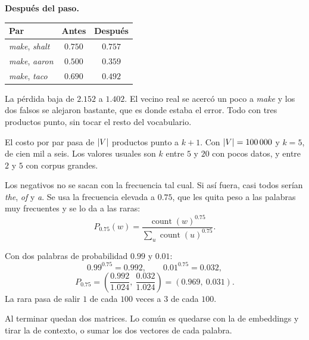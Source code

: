 \documentclass[11pt,letterpaper]{article}
\begin{document}
\begin{ejemplo}
    \textbf{Después del paso.}
    \begin{center}
    \begin{tabular}{lcc}
        \toprule
        \textbf{Par} & \textbf{Antes} & \textbf{Después} \\
        \midrule
        \textit{make}, \textit{shalt} & $0.750$ & $0.757$ \\
        \textit{make}, \textit{aaron} & $0.500$ & $0.359$ \\
        \textit{make}, \textit{taco}  & $0.690$ & $0.492$ \\
        \bottomrule
    \end{tabular}
    \end{center}
    La pérdida baja de $2.152$ a $1.402$. El vecino real se acercó un
    poco a \textit{make} y los dos falsos se alejaron bastante, que es
    donde estaba el error. Todo con tres productos punto, sin tocar el
    resto del vocabulario.
\end{ejemplo}

\begin{idea}
    El costo por par pasa de $\left\lvert V \right\rvert$ productos punto a $k + 1$. Con
    $\left\lvert V \right\rvert = 100\,000$ y $k = 5$, de cien mil a seis. Los valores
    usuales son $k$ entre $5$ y $20$ con pocos datos, y entre $2$ y
    $5$ con corpus grandes.
\end{idea}

Los negativos no se sacan con la frecuencia tal cual. Si así fuera,
casi todos serían \textit{the}, \textit{of} y \textit{a}. Se usa la
frecuencia elevada a $0.75$, que les quita peso a las palabras muy
frecuentes y se lo da a las raras:
\[
    P_{0.75}(w) = \frac{\operatorname{count}(w)^{0.75}}
                       {\sum_{u} \operatorname{count}(u)^{0.75}} .
\]

\begin{ejemplo}
    Con dos palabras de probabilidad $0.99$ y $0.01$:
    \[
        0.99^{0.75} = 0.992 , \qquad 0.01^{0.75} = 0.032 ,
    \]
    \[
        P_{0.75} = \left( \frac{0.992}{1.024},\ \frac{0.032}{1.024}
                   \right) = (0.969,\ 0.031) .
    \]
    La rara pasa de salir $1$ de cada $100$ veces a $3$ de cada $100$.
\end{ejemplo}

Al terminar quedan dos matrices. Lo común es quedarse con la de
embeddings y tirar la de contexto, o sumar los dos vectores de cada
palabra.

\end{document}
